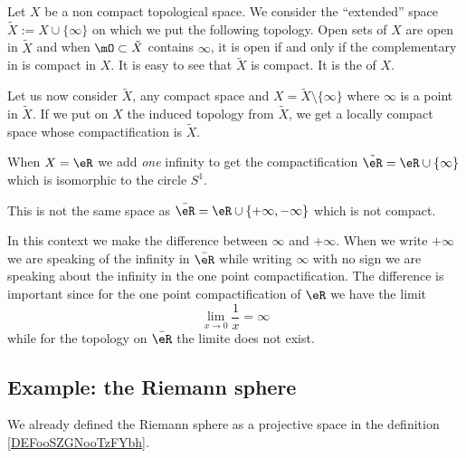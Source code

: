\begin{definition}  \label{DEFooAKWJooWKcYav}
    Let $X$ be a non compact topological space. We consider the ``extended'' space $\tilde X:=X\cup\{ \infty\}$ on which we put the following topology. Open sets of $X$ are open in $\tilde X$ and when $\mO\subset\tilde X$ contains $\infty$, it is open if and only if the complementary in is compact in $X$. It is easy to see that $\tilde X$ is compact. It is the  of $X$.
\end{definition}

Let us now consider $\tilde X$, any compact space and $X=\tilde X\setminus\{\infty\}$ where $\infty$ is a point in $\tilde X$. If we put on $X$ the induced topology from $\tilde X$, we get a locally compact space whose compactification is $\tilde X$.

\begin{example}
    When \( X=\eR\) we add \emph{one} infinity to get the compactification \( \tilde \eR=\eR\cup\{ \infty \}\) which is isomorphic to the circle \( S^1\). 

    This is not the same space as \( \bar \eR=\eR\cup\{ +\infty,-\infty \}\) which is not compact.
\end{example}

In this context we make the difference between \( \infty\) and \( +\infty\). When we write \( +\infty\) we are speaking of the infinity in \( \bar \eR\) while writing \( \infty\) with no sign we are speaking about the infinity in the one point compactification. The difference is important since for the one point compactification of \( \eR\) we have the limit
\begin{equation}
    \lim_{x\to 0} \frac{1}{ x }=\infty
\end{equation}
while for the topology on \( \bar \eR\) the limite does not exist.

\subsection{Example: the Riemann sphere}
\label{SEBSECooLJSEooNlyFYv}

We already defined the Riemann sphere as a projective space in the definition \ref{DEFooSZGNooTzFYbh}.

